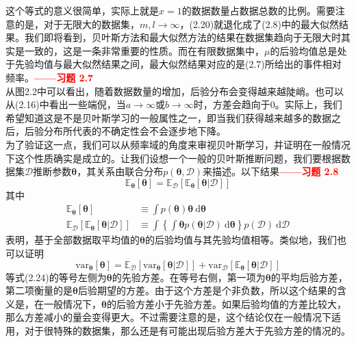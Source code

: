 \documentclass[b5paper]{book}
\numberwithin{equation}{chapter}
\begin{document}
{\begin{equation}
	\end{equation}
	这个等式的意义很简单，实际上就是$x=1$的数据数量占数据总数的比例。需要注意的是，对于无限大的数据集，$m,l \rightarrow \infty$，(2.20)就退化成了(2.8)中的最大似然结果。我们即将看到，贝叶斯方法和最大似然方法的结果在数据集趋向于无限大时其实是一致的，这是一条非常重要的性质。而在有限数据集中，$\mu$的后验均值总是处于先验均值与最大似然结果之间，最大似然结果对应的是(2.7)所给出的事件相对频率。\textcolor{red}{\textbf{——习题 2.7}}\\
	\indent 从图2.2中可以看出，随着数据数量的增加，后验分布会变得越来越陡峭。也可以从(2.16)中看出一些端倪，当$a \rightarrow \infty$或$b \rightarrow \infty$时，方差会趋向于0。实际上，我们希望知道这是不是贝叶斯学习的一般属性之一，即当我们获得越来越多的数据之后，后验分布所代表的不确定性会不会逐步地下降。\\
	\indent 为了验证这一点，我们可以从频率域的角度来审视贝叶斯学习，并证明在一般情况下这个性质确实是成立的。让我们设想一个一般的贝叶斯推断问题，我们要根据数据集$\mathcal{D}$推断参数$\boldsymbol{\theta}$，其关系由联合分布$p(\boldsymbol{\theta},\mathcal{D})$来描述。以下结果\textcolor{red}{\textbf{——习题 2.8}}
	\begin{equation}
		\mathbb{E}_{\boldsymbol{\theta}}[\boldsymbol{\theta}]=\mathbb{E}_{\mathcal{D}}[\mathbb{E}_{\boldsymbol{\theta}}[\boldsymbol{\theta}|\mathcal{D}]]
	\end{equation}
	其中
	\begin{align}
		\mathbb{E}_{\boldsymbol{\theta}}[\boldsymbol{\theta}] &\equiv \int p(\boldsymbol{\theta})\boldsymbol{\theta}\ \mathrm{d}\boldsymbol{\theta} \\
		\mathbb{E}_{\mathcal{D}}[\mathbb{E}_{\boldsymbol{\theta}}[\boldsymbol{\theta}|\mathcal{D}]] &\equiv \int \left\{\int \boldsymbol{\theta} p(\boldsymbol{\theta}|\mathcal{D})\ \mathrm{d}\boldsymbol{\theta} \right\}p(\mathcal{D})\ \mathrm{d}\mathcal{D}
	\end{align}
	表明，基于全部数据取平均值的$\boldsymbol{\theta}$的后验均值与其先验均值相等。类似地，我们也可以证明
	\begin{equation}
		\mathrm{var}_{\boldsymbol{\theta}}[\boldsymbol{\theta}]=\mathbb{E}_{\mathcal{D}}[\mathrm{var}_{\boldsymbol{\theta}}[\boldsymbol{\theta}|\mathcal{D}]] + \mathrm{var}_{\mathcal{D}}[\mathbb{E}_{\boldsymbol{\theta}}[\boldsymbol{\theta}|\mathcal{D}]]
	\end{equation}
	等式(2.24)的等号左侧为$\boldsymbol{\theta}$的先验方差。在等号右侧，第一项为$\boldsymbol{\theta}$的平均后验方差，第二项衡量的是$\boldsymbol{\theta}$后验期望的方差。由于这个方差是个非负数，所以这个结果的含义是，在一般情况下，$\boldsymbol{\theta}$的后验方差小于先验方差。如果后验均值的方差比较大，那么方差减小的量会变得更大。不过需要注意的是，这个结论仅在一般情况下适用，对于很特殊的数据集，那么还是有可能出现后验方差大于先验方差的情况的。
	}
\end{document}
